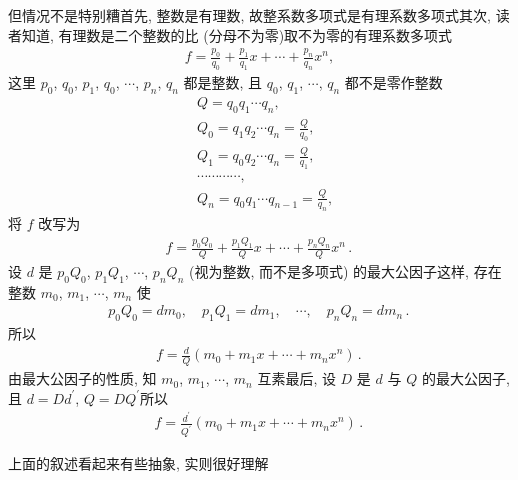 但情况不是特别糟\period 首先, 整数是有理数, 故整系数多项式是有理系数多项式\period 其次, 读者知道, 有理数是二个整数的比 (分母不为零)\period 取不为零的有理系数多项式
\begin{align*}
    f = \frac{p_0}{q_0} + \frac{p_1}{q_1} x + \cdots + \frac{p_n}{q_n} x^n,
\end{align*}
这里 $p_0$, $q_0$, $p_1$, $q_0$, $\cdots$, $p_n$, $q_n$ 都是整数, 且 $q_0$, $q_1$, $\cdots$, $q_n$ 都不是零\period 作整数
\begin{align*}
     & Q = q_0 q_1 \cdots q_n,                       \\
     & Q_0 = q_1 q_2 \cdots q_n = \frac{Q}{q_0},     \\
     & Q_1 = q_0 q_2 \cdots q_n = \frac{Q}{q_1},     \\
     & \cdots \cdots \cdots \cdots,                  \\
     & Q_n = q_0 q_1 \cdots q_{n-1} = \frac{Q}{q_n},
\end{align*}
将 $f$ 改写为
\begin{align*}
    f = \frac{p_0 Q_0}{Q} + \frac{p_1 Q_1}{Q} x + \cdots + \frac{p_n Q_n}{Q} x^n \period
\end{align*}
设 $d$ 是 $p_0 Q_0$, $p_1 Q_1$, $\cdots$, $p_n Q_n$ (视为整数, 而不是多项式) 的最大公因子\period 这样, 存在整数 $m_0$, $m_1$, $\cdots$, $m_n$ 使
\begin{align*}
    p_0 Q_0 = d m_0, \quad p_1 Q_1 = d m_1, \quad \cdots, \quad p_n Q_n = d m_n \period
\end{align*}
所以
\begin{align*}
    f = \frac{d}{Q} (m_0 + m_1 x + \cdots + m_n x^n) \period
\end{align*}
由最大公因子的性质, 知 $m_0$, $m_1$, $\cdots$, $m_n$ 互素\period 最后, 设 $D$ 是 $d$ 与 $Q$ 的最大公因子, 且 $d = Dd^{\prime}$, $Q = DQ^{\prime}$\period 所以
\begin{align*}
    f = \frac{d^{\prime}}{Q^{\prime}} (m_0 + m_1 x + \cdots + m_n x^n) \period
\end{align*}

上面的叙述看起来有些抽象, 实则很好理解\period

